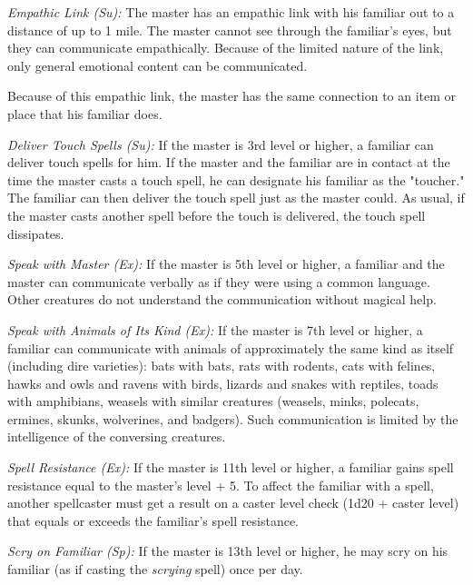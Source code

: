 \textit{Empathic Link (Su):} The master has an empathic link with his familiar out to a distance of up to 1 mile. The master cannot see through the familiar's eyes, but they can communicate empathically. Because of the limited nature of the link, only general emotional content can be communicated.

Because of this empathic link, the master has the same connection to an item or place that his familiar does.

\textit{Deliver Touch Spells (Su):} If the master is 3rd level or higher, a familiar can deliver touch spells for him. If the master and the familiar are in contact at the time the master casts a touch spell, he can designate his familiar as the "toucher." The familiar can then deliver the touch spell just as the master could. As usual, if the master casts another spell before the touch is delivered, the touch spell dissipates.

\textit{Speak with Master (Ex):} If the master is 5th level or higher, a familiar and the master can communicate verbally as if they were using a common language. Other creatures do not understand the communication without magical help.

\textit{Speak with Animals of Its Kind (Ex):} If the master is 7th level or higher, a familiar can communicate with animals of approximately the same kind as itself (including dire varieties): bats with bats, rats with rodents, cats with felines, hawks and owls and ravens with birds, lizards and snakes with reptiles, toads with amphibians, weasels with similar creatures (weasels, minks, polecats, ermines, skunks, wolverines, and badgers). Such communication is limited by the intelligence of the conversing creatures.

\textit{Spell Resistance (Ex):} If the master is 11th level or higher, a familiar gains spell resistance equal to the master's level + 5. To affect the familiar with a spell, another spellcaster must get a result on a caster level check (1d20 + caster level) that equals or exceeds the familiar's spell resistance.

\textit{Scry on Familiar (Sp):} If the master is 13th level or higher, he may scry on his familiar (as if casting the \textit{scrying }spell) once per day.

